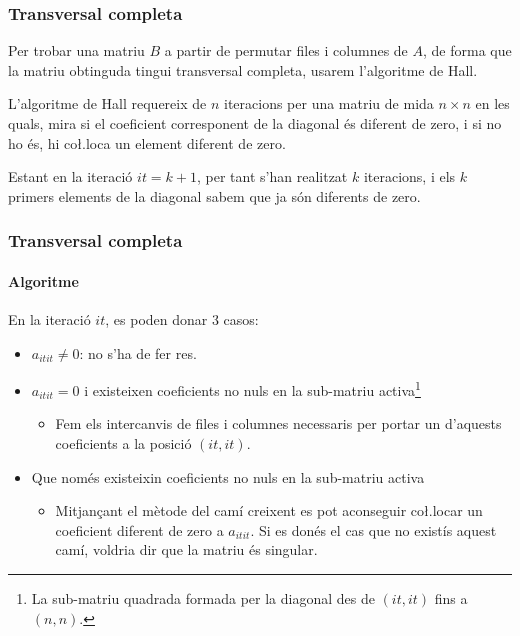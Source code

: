 \documentclass[8pt]{beamer}
\begin{document}
\begin{frame}
  \frametitle{Transversal completa}

Per trobar una matriu $B$ a partir de permutar files i columnes de $A$, de forma que la matriu obtinguda tingui transversal completa, usarem l'algoritme de Hall.

L'algoritme de Hall requereix de $n$ iteracions per una matriu de mida $n \times n$ en les quals, mira si el coeficient corresponent de la diagonal és diferent de zero, i si no ho és, hi co\l.loca un element diferent de zero.

Estant en la iteració $it = k+1$, per tant s'han realitzat $k$ iteracions, i els $k$ primers elements de la diagonal sabem que ja són diferents de zero. 

\end{frame}
\begin{frame}
  \frametitle{Transversal completa}
  \framesubtitle{Algoritme}
En la iteració $it$, es poden donar 3 casos:

\begin{itemize}
  \item $a_{it it} \neq 0$: no s'ha de fer res.
  \item  $a_{it it} = 0$ i existeixen coeficients no nuls en la sub-matriu activa\footnote{La sub-matriu quadrada formada per la diagonal des de $(it,it)$ fins a $(n,n)$.}
  \begin{itemize}
  \item Fem els intercanvis de files i columnes necessaris per portar un d'aquests coeficients a la posició $(it, it)$.
  \end{itemize}
  \item Que només existeixin coeficients no nuls en la sub-matriu activa\footnotemark[\value{footnote}]
  \begin{itemize}
  \item Mitjançant el mètode del camí creixent es pot aconseguir co\l.locar un coeficient diferent de zero a $a_{it it}$. Si es donés el cas que no existís aquest camí, voldria dir que la matriu és singular.
  \end{itemize}
  \end{itemize}
  
\end{frame}
\end{document}

